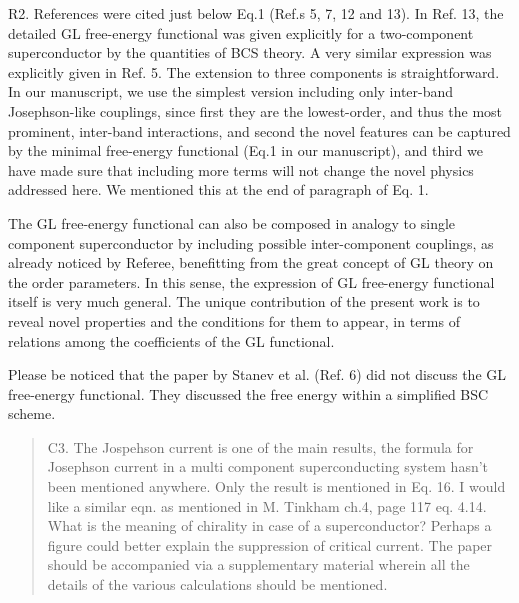 \documentclass[11pt]{article}
\begin{document}
R2. References were cited just below Eq.1 (Ref.s 5, 7, 12 and 13). In
Ref. 13, the detailed GL free-energy functional was given explicitly for
a two-component superconductor by the quantities of BCS theory. A very
similar expression was explicitly given in Ref. 5. The extension to
three components is straightforward. In our manuscript, we use the
simplest version including only inter-band Josephson-like couplings,
since first they are the lowest-order, and thus the most prominent,
inter-band interactions, and second the novel features can be captured
by the minimal free-energy functional (Eq.1 in our manuscript), and
third we have made sure that including more terms will not change the
novel physics addressed here. We mentioned this at the end of paragraph
of Eq. 1.

The GL free-energy functional can also be composed in analogy to single
component superconductor by including possible inter-component
couplings, as already noticed by Referee, benefitting from the great
concept of GL theory on the order parameters. In this sense, the
expression of GL free-energy functional itself is very much general. The
unique contribution of the present work is to reveal novel properties
and the conditions for them to appear, in terms of relations among the
coefficients of the GL functional.

Please be noticed that the paper by Stanev et al. (Ref. 6) did not
discuss the GL free-energy functional. They discussed the free energy
within a simplified BSC scheme.

\begin{quote}
C3. The Jospehson current is one of the main results, the formula for
Josephson current in a multi component superconducting system hasn't
been mentioned anywhere. Only the result is mentioned in Eq. 16. I would
like a similar eqn. as mentioned in M. Tinkham ch.4, page 117 eq. 4.14.
What is the meaning of chirality in case of a superconductor? Perhaps a
figure could better explain the suppression of critical current. The
paper should be accompanied via a supplementary material wherein all the
details of the various calculations should be mentioned.
\end{quote}
\end{document}
